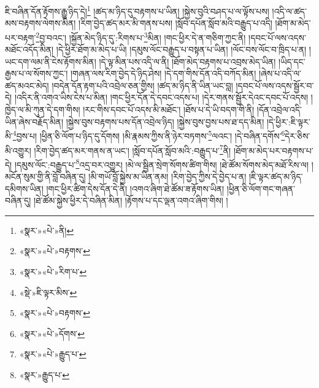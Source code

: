 ཇི་བཞིན་དོན་རྟོགས་རྒྱུ་ཉིད་དེ།\footnote{«སྣར་»«པེ་»ནི།} །ཚད་མ་ཉིད་དུ་བརྟགས་པ་ཡིན། །སྐྱེས་བུའི་བཤད་པ་ལ་ལྟོས་པས། །འདི་ལ་ཚད་མས་བརྟགས་ལེགས་མིན། །རིག་བྱེད་ཚད་མར་མི་གནས་པས། །སློབ་དཔོན་སློབ་མའི་བརྒྱུད་པ་འདི། །ཐོག་མ་མེད་པར་བརྟག་\footnote{«སྣར་»«པེ་»བརྟགས་}བྱ་བའང་། །སྐྱོན་མེད་ཉིད་དུ་:རིགས་པ་\footnote{«སྣར་»«པེ་»རིག་པ་}མིན། །གང་ཕྱིར་དེ་ན་གཅིག་ཀྱང་ནི། །དབང་པོ་ལས་འདས་མཐོང་འདོད་མིན། །དེ་ཕྱིར་ཐོག་མ་མེད་པ་ཡི། །དམུས་ལོང་བརྒྱུད་པ་བསྟན་པ་ཡིན། །ལོང་བས་ལོང་བ་ཁྲིད་པ་ན། །ཡང་དག་ལམ་ནི་ངེས་རྟོགས་མིན། །དེ་ལྟ་མིན་པས་འདི་ལ་ནི། །ཐོག་མེད་བརྟགས་པ་འབྲས་མེད་ཡིན། །ཡིད་དང་རྒྱས་པ་ལ་སོགས་ཀྱང་། །གཞན་ལས་རིག་བྱེད་དེ་ཉིད་ཤེས། །དེ་དག་གིས་དོན་འདི་བཀོད་མིན། །ཞེས་པ་འདི་ལ་ཚད་མའང་མེད། །བདེན་དོན་རྟག་པའི་འབྲེལ་ཅན་གྱིས། །ཚད་མ་ཉིད་ནི་ཡིན་ཡང་བླ། །དབང་པོ་ལས་འདས་སྦྱོར་བ་དེ། །འདིར་ནི་འགའ་ཡིས་ངེས་པ་མིན། །གང་ཕྱིར་དོན་དེ་དབང་འདས་པ། །དེར་གནས་སྦྱོར་དེའང་དབང་པོ་འདས། །ཁྱེད་ལ་མི་ཀུན་དེ་དག་གིས། །རང་གིས་དབང་པོ་འདས་མི་མཐོང་། །ཐོས་པ་དེ་ཡི་བདག་གི་ནི། །དོན་འབྲེལ་འདི་ཡིན་ཞེས་བརྗོད་མིན། །སྐྱེས་བུས་བརྟགས་པས་དོན་འབྲེལ་ཉིད། །སྐྱེས་བུས་བྱས་པས་ཐ་དད་མིན། །དེ་ཕྱིར་:ཇི་ལྟར་མི་\footnote{«སྡེ་»ཇི་ལྟར་མིས་}བྱས་པ། །ཕྱིན་ཅི་ལོག་པ་ཉིད་དུ་དོགས། །མི་རྣམས་ཀྱིས་ནི་ཉེར་བཏགས་\footnote{«སྣར་»«པེ་»བརྟགས་}ལའང་། །དེ་བཞིན་དགོས་\footnote{«སྣར་»«པེ་»དོགས་}དེར་ཅིས་མི་འགྱུར། །རིག་བྱེད་ཚད་མར་གནས་ན་ཡང་། །སློབ་དཔོན་སློབ་མའི་:བརྒྱུད་པ་\footnote{«སྣར་»«པེ་»རྒྱུད་པ་}ནི། །ཐོག་མ་མེད་པར་བརྟགས་པ་དེ། །དམུས་ལོང་:བརྒྱུད་པ་\footnote{«སྣར་»རྒྱུད་པ་}འདྲ་བར་འགྱུར། །མེ་ལ་སྦྱིན་སྲེག་སོགས་ཚིག་གིས། །ཐེ་ཚོམ་སོགས་མེད་མཐོ་རིས་ལ། །མངོན་སུམ་གྱི་ནི་བློ་བཞིན་དུ། །མི་གཡོ་བློ་སྐྱེས་མ་ཡིན་ནམ། །རིག་བྱེད་ཀྱིས་དེ་བྱེད་པ་ན། །ཇི་ལྟར་ཚད་མ་ཉིད་དམིགས་ཡིན། །གང་ཕྱིར་ཚིག་དེས་དོན་དེ་ནི། །འགའ་ཞིག་ཐེ་ཚོམ་ཟ་རྟོགས་ཡིན། །ཕྱིན་ཅི་ལོག་གང་གཞན་བཞིན་དུ། །ཐེ་ཚོམ་སྐྱེས་ཕྱིར་དེ་བཞིན་མིན། །རྟོགས་པ་དང་ལྡན་འགའ་ཞིག་གིས། །

